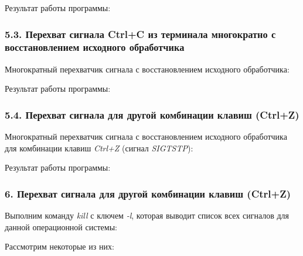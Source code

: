 \documentclass[14pt,a4paper,report]{report}
\begin{document}


Результат работы программы:



\subsubsection{5.3. Перехват сигнала Ctrl+C из терминала многократно с восстановлением исходного обработчика}

Многократный перехватчик сигнала с восстановлением исходного обработчика:



Результат работы программы:



\subsubsection{5.4. Перехват сигнала для другой комбинации клавиш (Ctrl+Z)}

Многократный перехватчик сигнала с восстановлением исходного обработчика для комбинации клавиш \emph{Ctrl+Z} (сигнал \emph{SIGTSTP}):



Результат работы программы:



\subsubsection{6. Перехват сигнала для другой комбинации клавиш (Ctrl+Z)}

Выполним команду \emph{kill} с ключем \emph{-l}, которая выводит список всех сигналов для данной операционной системы:



Рассмотрим некоторые из них:
\end{document}
